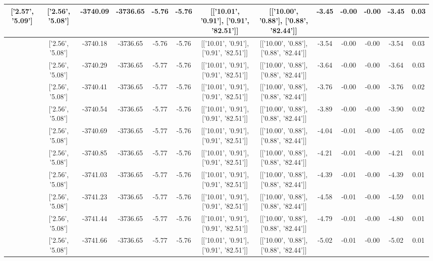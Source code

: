 \begin{table}[htbp]
\begin{adjustbox}{angle=90}
\begin{tabular}{|c|c|c|c|c|c|c|c|c|c|c|c|c|}
 ['2.57', '5.09'] & ['2.56', '5.08'] & -3740.09 & -3736.65 & -5.76 & -5.76 & [['10.01', '0.91'], ['0.91', '82.51']] & [['10.00', '0.88'], ['0.88', '82.44']] & -3.45 & -0.00 & -0.00 & -3.45 & 0.03\\ \hline
 ['2.57', '5.09'] & ['2.56', '5.08'] & -3740.18 & -3736.65 & -5.76 & -5.76 & [['10.01', '0.91'], ['0.91', '82.51']] & [['10.00', '0.88'], ['0.88', '82.44']] & -3.54 & -0.00 & -0.00 & -3.54 & 0.03\\ \hline
 ['2.57', '5.09'] & ['2.56', '5.08'] & -3740.29 & -3736.65 & -5.77 & -5.76 & [['10.01', '0.91'], ['0.91', '82.51']] & [['10.00', '0.88'], ['0.88', '82.44']] & -3.64 & -0.00 & -0.00 & -3.64 & 0.03\\ \hline
 ['2.57', '5.09'] & ['2.56', '5.08'] & -3740.41 & -3736.65 & -5.77 & -5.76 & [['10.01', '0.91'], ['0.91', '82.51']] & [['10.00', '0.88'], ['0.88', '82.44']] & -3.76 & -0.00 & -0.00 & -3.76 & 0.02\\ \hline
 ['2.57', '5.09'] & ['2.56', '5.08'] & -3740.54 & -3736.65 & -5.77 & -5.76 & [['10.01', '0.91'], ['0.91', '82.51']] & [['10.00', '0.88'], ['0.88', '82.44']] & -3.89 & -0.00 & -0.00 & -3.90 & 0.02\\ \hline
 ['2.58', '5.09'] & ['2.56', '5.08'] & -3740.69 & -3736.65 & -5.77 & -5.76 & [['10.01', '0.91'], ['0.91', '82.51']] & [['10.00', '0.88'], ['0.88', '82.44']] & -4.04 & -0.01 & -0.00 & -4.05 & 0.02\\ \hline
 ['2.58', '5.09'] & ['2.56', '5.08'] & -3740.85 & -3736.65 & -5.77 & -5.76 & [['10.01', '0.91'], ['0.91', '82.51']] & [['10.00', '0.88'], ['0.88', '82.44']] & -4.21 & -0.01 & -0.00 & -4.21 & 0.01\\ \hline
 ['2.58', '5.09'] & ['2.56', '5.08'] & -3741.03 & -3736.65 & -5.77 & -5.76 & [['10.01', '0.91'], ['0.91', '82.51']] & [['10.00', '0.88'], ['0.88', '82.44']] & -4.39 & -0.01 & -0.00 & -4.39 & 0.01\\ \hline
 ['2.58', '5.09'] & ['2.56', '5.08'] & -3741.23 & -3736.65 & -5.77 & -5.76 & [['10.01', '0.91'], ['0.91', '82.51']] & [['10.00', '0.88'], ['0.88', '82.44']] & -4.58 & -0.01 & -0.00 & -4.59 & 0.01\\ \hline
 ['2.58', '5.09'] & ['2.56', '5.08'] & -3741.44 & -3736.65 & -5.77 & -5.76 & [['10.01', '0.91'], ['0.91', '82.51']] & [['10.00', '0.88'], ['0.88', '82.44']] & -4.79 & -0.01 & -0.00 & -4.80 & 0.01\\ \hline
 ['2.58', '5.09'] & ['2.56', '5.08'] & -3741.66 & -3736.65 & -5.77 & -5.76 & [['10.01', '0.91'], ['0.91', '82.51']] & [['10.00', '0.88'], ['0.88', '82.44']] & -5.02 & -0.01 & -0.00 & -5.02 & 0.01\\ \hline

\end{tabular}
\end{adjustbox}
\end{table}
